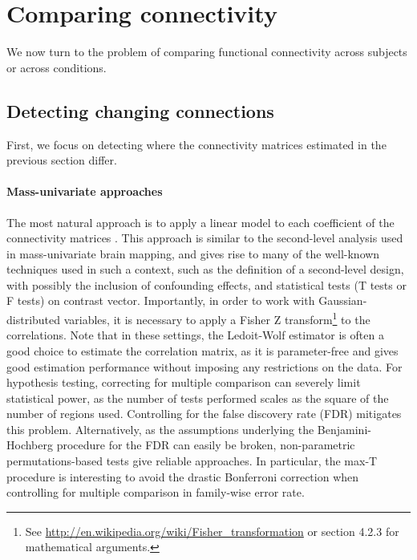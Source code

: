 \documentclass[5p]{elsarticle}
\begin{document}




\section{Comparing connectivity}

We now turn to the problem of comparing functional
connectivity across subjects or across conditions.

\subsection{Detecting changing connections}

First, we focus on detecting where the connectivity matrices estimated in
the previous section differ.

\paragraph{Mass-univariate approaches}
The most natural approach is to apply a linear model to each coefficient of
the connectivity matrices \cite{lewis2009,grillon2012}. This
approach is similar to the second-level analysis used in mass-univariate
brain mapping, and gives rise to many of the well-known techniques
used in such a context, such as the definition of a second-level design,
with possibly the inclusion of confounding effects, and statistical tests
(T tests or F tests) on contrast vector. Importantly, in order to work
with Gaussian-distributed variables, it is necessary to apply a Fisher
Z transform\footnote{See
\url{http://en.wikipedia.org/wiki/Fisher_transformation} or
\cite{anderson1958} section 4.2.3 for mathematical arguments.} to the
correlations. Note that
in these settings, the Ledoit-Wolf estimator \cite{ledoit2004} is
often a good choice to estimate the correlation matrix, as it is
parameter-free and gives good estimation performance without imposing any
restrictions on the data.
%
For hypothesis testing,
correcting for multiple comparison can severely limit statistical
power, as the number of tests performed scales as the square of the
number of regions used. Controlling for the false discovery rate (FDR)
mitigates this problem. Alternatively, as the assumptions underlying the
Benjamini-Hochberg procedure \cite{benjamini1995} for the FDR can easily
be broken, non-parametric permutations-based tests give reliable
approaches. In particular, the max-T procedure \cite{ge2003,nichols2001}
is interesting to avoid the drastic Bonferroni correction when
controlling for multiple comparison in family-wise error rate.
\end{document}
